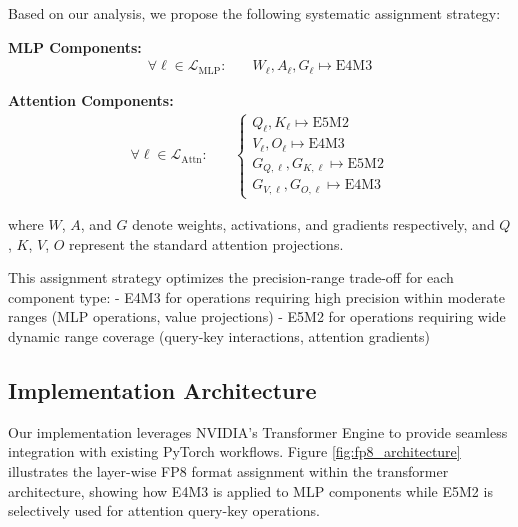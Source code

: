 \documentclass[conference]{IEEEtran}
\begin{document}
Based on our analysis, we propose the following systematic assignment strategy:

\textbf{MLP Components:}
\begin{align}
\forall \ell \in \mathcal{L}_{\mathrm{MLP}}: \quad &W_{\ell}, A_{\ell}, G_{\ell} \mapsto \text{E4M3} \label{eq:mlp_assignment}
\end{align}

\textbf{Attention Components:}
\begin{align}
\forall \ell \in \mathcal{L}_{\mathrm{Attn}}: \quad &\begin{cases}
Q_{\ell}, K_{\ell} \mapsto \text{E5M2} \\
V_{\ell}, O_{\ell} \mapsto \text{E4M3} \\
G_{Q,\ell}, G_{K,\ell} \mapsto \text{E5M2} \\
G_{V,\ell}, G_{O,\ell} \mapsto \text{E4M3}
\end{cases} \label{eq:attn_assignment}
\end{align}

where $W$, $A$, and $G$ denote weights, activations, and gradients respectively, and $Q$, $K$, $V$, $O$ represent the standard attention projections.

This assignment strategy optimizes the precision-range trade-off for each component type:
- E4M3 for operations requiring high precision within moderate ranges (MLP operations, value projections)
- E5M2 for operations requiring wide dynamic range coverage (query-key interactions, attention gradients)

\subsection{Implementation Architecture}

Our implementation leverages NVIDIA's Transformer Engine to provide seamless integration with existing PyTorch workflows. Figure \ref{fig:fp8_architecture} illustrates the layer-wise FP8 format assignment within the transformer architecture, showing how E4M3 is applied to MLP components while E5M2 is selectively used for attention query-key operations.
\end{document}

